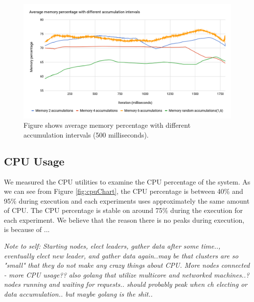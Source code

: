 \documentclass[USenglish]{uit-thesis}
\begin{document}

\begin{figure} [ht]
\centering
\includegraphics[width=\textwidth]{memChart2.png}
\caption{Figure shows average memory percentage with different accumulation intervals (500 milliseconds).}
\label{fig:memChart}
\end{figure}


\subsection{CPU Usage}
We measured the CPU utilities to examine the CPU percentage of the system. As we can see from Figure \ref{fig:cpuChart}, the CPU percentage is between 40\% and 95\% during execution and each experiments uses approximately the same amount of CPU.
The CPU percentage is stable on around 75\% during the execution for each experiment. We believe that the reason there is no peaks during execution, is because of ...

\textit{Note to self: Starting nodes, elect leaders, gather data after some time.., eventually elect new leader, and gather data again..may be that clusters are so "small" that they do not make any crazy things about CPU. More nodes connected - more CPU usage?? also golang that utilize multicore and networked machines..? nodes running and waiting for requests.. should probably peak when ch electing or data accumulation.. but maybe golang is the shit..}

\end{document}
